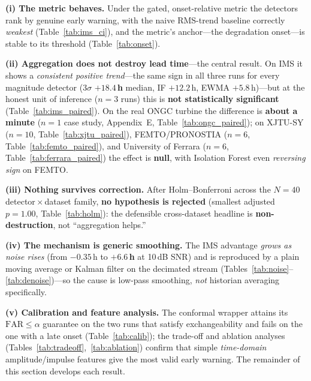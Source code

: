 \documentclass[journal]{IEEEtran}
\begin{document}
\textbf{(i) The metric behaves.} Under the gated, onset-relative metric the
detectors rank by genuine early warning, with the naive RMS-trend baseline
correctly \emph{weakest} (Table~\ref{tab:ims_ci}), and the metric's
anchor---the degradation onset---is stable to its threshold
(Table~\ref{tab:onset}).

\textbf{(ii) Aggregation does not destroy lead time}---the central result.
On IMS it shows a \emph{consistent positive trend}---the same sign in all three
runs for every magnitude detector (3$\sigma$ \textbf{$+18.4$\,h} median, IF
$+12.2$\,h, EWMA $+5.8$\,h)---but at the honest unit of inference ($n{=}3$ runs)
this is \textbf{not statistically significant} (Table~\ref{tab:ims_paired}).
On the real ONGC turbine the difference is \textbf{about a minute} ($n{=}1$ case
study, Appendix~E, Table~\ref{tab:ongc_paired}); on XJTU-SY ($n{=}10$,
Table~\ref{tab:xjtu_paired}), FEMTO/PRONOSTIA ($n{=}6$,
Table~\ref{tab:femto_paired}), and University of Ferrara ($n{=}6$,
Table~\ref{tab:ferrara_paired}) the effect is \textbf{null}, with Isolation Forest
even \emph{reversing sign} on FEMTO.

\textbf{(iii) Nothing survives correction.} After Holm--Bonferroni across the
$N{=}40$ detector\,$\times$\,dataset family, \textbf{no hypothesis is rejected}
(smallest adjusted $p=1.00$, Table~\ref{tab:holm}): the defensible cross-dataset
headline is \textbf{non-destruction}, not ``aggregation helps.''

\textbf{(iv) The mechanism is generic smoothing.} The IMS advantage \emph{grows
as noise rises} (from $-0.35$\,h to \textbf{$+6.6$\,h} at 10\,dB SNR) and is
reproduced by a plain moving average or Kalman filter on the decimated stream
(Tables~\ref{tab:noise}--\ref{tab:denoise})---so the cause is low-pass smoothing,
\emph{not} historian averaging specifically.

\textbf{(v) Calibration and feature analysis.} The conformal wrapper attains its
$\mathrm{FAR}\le\alpha$ guarantee on the two runs that satisfy exchangeability
and fails on the one with a late onset (Table~\ref{tab:calib}); the trade-off and
ablation analyses (Tables~\ref{tab:tradeoff},~\ref{tab:ablation}) confirm that
simple \emph{time-domain} amplitude/impulse features give the most valid early
warning. The remainder of this section develops each result.
\end{document}
